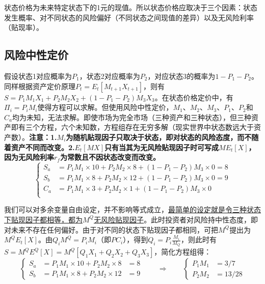 \documentclass[11pt]{article}
\begin{document}
状态价格为未来特定状态下的1元的现值。所以状态价格应取决于三个因素：状态发生概率、对不同状态的风险偏好（不同状态之间现值的差异）以及无风险利率（贴现率）。

\subsection{风险中性定价}
假设状态1对应概率为$P_1$，状态2对应概率为$P_2$，对应状态3的概率为$1-P_1-P_2$。同样根据资产定价原理$P_t=E_t[M_{t+1}X_{t+1}]$，则有$S=P_1M_1X_1 + P_2M_2X_2+(1-P_1-P_2)M_3X_3$。在状态价格定价中，有$\Pi_i = P_iM_i$使得方程可以求解。但使用风险中性定价，$M_1$、$M_2$、$M_3$、$P_1$、$P_2$和$C_a$均为未知，无法求解。即使市场为完全市场（三种资产和三种状态），但三种资产即有三个方程，六个未知数，方程组存在无穷多解（现实世界中状态数远大于资产数）。\textbf{注意：1.$M_i$为随机贴现因子只取决于状态，即对状态的风险态度，而不随着资产不同而改变。2.$E_t[MX]$只有当其为无风险贴现因子时可写成$ME_t[X]$，因为无风险利率$r_f$为常数且不因状态改变而改变。}
\begin{equation*}
  \left\{
    \begin{aligned}
      S_a &= P_1M_1 \times 10 + P_2M_2 \times 8 + (1-P_1-P_2)M_3 \times 0 = 8\\
      S_b &= P_1M_1 \times 8 + P_2M_2 \times 12 + (1-P_1-P_2)M_3 \times 0 = 9\\
      C_a &= P_1M_1 \times 3 + P_2M_2 \times 1 + (1-P_1-P_2)M_3 \times 0 \\
    \end{aligned}
  \right.
\end{equation*}

我们可以对多余变量自由设定，并不影响等式成立，\uline{最简单的设定就是令三种状态下贴现因子都相等，都为$M^Q$无风险贴现因子}。此时投资者对风险持中性态度，即对未来不存在任何偏好。由于对不同的状态下贴现因子都相同，可把$M^Q$提出为$M^QE_t[X]$。由$Q_i M^Q = P_i M_i$（即$PC_i$），得到$Q_i = P_i \frac{M_i}{M_Q}$，则此时有$S = M^Q E^Q[X] = M^Q[Q_1X_1 + Q_2X_2 + Q_3X_3]$，简化方程组得：
\begin{equation*}
  \left\{
    \begin{aligned}
      S_a &= P_1M_1 \times 10 + P_2M_2 \times 8  &= 8 \\
      S_b &= P_1M_1 \times 8 + P_2M_2 \times 12  &= 9
    \end{aligned}
  \right.
  \qquad
  \Rightarrow
  \qquad
  \left\{
    \begin{aligned}
    P_1M_1 &= 3/7 \\
    P_2M_2 &= 13/28
    \end{aligned}
  \right.
\end{equation*}
\end{document}
